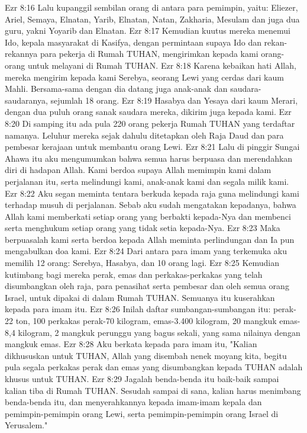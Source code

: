 Ezr 8:16  Lalu kupanggil sembilan orang di antara para pemimpin, yaitu: Eliezer, Ariel, Semaya, Elnatan, Yarib, Elnatan, Natan, Zakharia, Mesulam dan juga dua guru, yakni Yoyarib dan Elnatan.
Ezr 8:17  Kemudian kuutus mereka menemui Ido, kepala masyarakat di Kasifya, dengan permintaan supaya Ido dan rekan-rekannya para pekerja di Rumah TUHAN, mengirimkan kepada kami orang-orang untuk melayani di Rumah TUHAN.
Ezr 8:18  Karena kebaikan hati Allah, mereka mengirim kepada kami Serebya, seorang Lewi yang cerdas dari kaum Mahli. Bersama-sama dengan dia datang juga anak-anak dan saudara-saudaranya, sejumlah 18 orang.
Ezr 8:19  Hasabya dan Yesaya dari kaum Merari, dengan dua puluh orang sanak saudara mereka, dikirim juga kepada kami.
Ezr 8:20  Di samping itu ada pula 220 orang pekerja Rumah TUHAN yang terdaftar namanya. Leluhur mereka sejak dahulu ditetapkan oleh Raja Daud dan para pembesar kerajaan untuk membantu orang Lewi.
Ezr 8:21  Lalu di pinggir Sungai Ahawa itu aku mengumumkan bahwa semua harus berpuasa dan merendahkan diri di hadapan Allah. Kami berdoa supaya Allah memimpin kami dalam perjalanan itu, serta melindungi kami, anak-anak kami dan segala milik kami.
Ezr 8:22  Aku segan meminta tentara berkuda kepada raja guna melindungi kami terhadap musuh di perjalanan. Sebab aku sudah mengatakan kepadanya, bahwa Allah kami memberkati setiap orang yang berbakti kepada-Nya dan membenci serta menghukum setiap orang yang tidak setia kepada-Nya.
Ezr 8:23  Maka berpuasalah kami serta berdoa kepada Allah meminta perlindungan dan Ia pun mengabulkan doa kami.
Ezr 8:24  Dari antara para imam yang terkemuka aku memilih 12 orang: Serebya, Hasabya, dan 10 orang lagi.
Ezr 8:25  Kemudian kutimbang bagi mereka perak, emas dan perkakas-perkakas yang telah disumbangkan oleh raja, para penasihat serta pembesar dan oleh semua orang Israel, untuk dipakai di dalam Rumah TUHAN. Semuanya itu kuserahkan kepada para imam itu.
Ezr 8:26  Inilah daftar sumbangan-sumbangan itu: perak-22 ton, 100 perkakas perak-70 kilogram, emas-3.400 kilogram, 20 mangkuk emas-8,4 kilogram, 2 mangkuk perunggu yang bagus sekali, yang sama nilainya dengan mangkuk emas.
Ezr 8:28  Aku berkata kepada para imam itu, "Kalian dikhususkan untuk TUHAN, Allah yang disembah nenek moyang kita, begitu pula segala perkakas perak dan emas yang disumbangkan kepada TUHAN adalah khusus untuk TUHAN.
Ezr 8:29  Jagalah benda-benda itu baik-baik sampai kalian tiba di Rumah TUHAN. Sesudah sampai di sana, kalian harus menimbang benda-benda itu, dan menyerahkannya kepada imam-imam kepala dan pemimpin-pemimpin orang Lewi, serta pemimpin-pemimpin orang Israel di Yerusalem."
